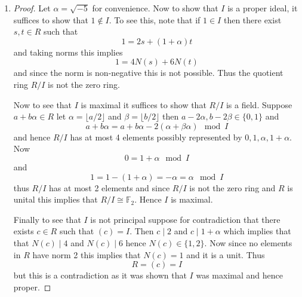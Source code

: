 \documentclass[12pt]{article}
\begin{document}
\begin{enumerate}
\begin{proof}
        Similarly $N(3) = 9$, $N(1 \pm \sqrt{-5}) = 6$ and a similar argument shows that these elements are irreducible.
        Thus $6$ factors in two ways as a product of irreducibles
        \[ 6 = 2 \cdot 3 = (1 + \sqrt{-5})(1 - \sqrt{-5}) \]
        Now since the only units in $R$ are $\pm 1$ these factorizations are distinct
        as an element with non-trivial imaginary part cannot be associates with a real valued element.
        Thus $R$ is not a UFD as $6$ does not have a unique factorization into a product of irreducibles.
    \end{proof}

    \item[(c)]
    \begin{proof}
        Let $\alpha = \sqrt{-5}$ for convenience. Now to show that $I$ is a proper ideal,
        it suffices to show that $1 \notin I$. To see this, note that if $1 \in I$ then there exist
        $s, t \in R$ such that
        \[ 1 = 2s + (1 + \alpha)t \]
        and taking norms this implies
        \[ 1 = 4N(s) + 6N(t) \]
        and since the norm is non-negative this is not possible. Thus the quotient ring $R/I$
        is not the zero ring.

        Now to see that $I$ is maximal it suffices to show that $R/I$ is a field.
        Suppose $a + b\alpha \in R$ let $\alpha = \lfloor a/2 \rfloor$ and $\beta = \lfloor b/2 \rfloor$
        then $a - 2\alpha, b - 2\beta \in \{ 0, 1 \}$ and
        \[ a + b\alpha = a + b\alpha - 2(\alpha + \beta\alpha) \mod I \]
        and hence $R/I$ has at most 4 elements possibly represented by $0, 1, \alpha, 1 + \alpha$.
        Now
        \[ 0 = 1 + \alpha \mod I \]
        and
        \[ 1 = 1 - (1 + \alpha) = -\alpha = \alpha \mod I \]
        thus $R/I$ has at most 2 elements and since $R/I$ is not the zero ring
        and $R$ is unital this implies that $R/I \cong \mathbb F_2$. Hence $I$ is maximal.

        Finally to see that $I$ is not principal suppose for contradiction that there exists $c \in R$
        such that $(c) = I$. Then $c \mid 2$ and $c \mid 1 + \alpha$ which implies that
        that $N(c) \mid 4$ and $N(c) \mid 6$ hence $N(c) \in \{ 1, 2 \}$. Now since no elements in $R$
        have norm 2 this implies that $N(c) = 1$ and it is a unit. Thus
        \[ R = (c) = I \]
        but this is a contradiction as it was shown that $I$ was maximal and hence proper.
    \end{proof}
\end{enumerate}
\end{document}
